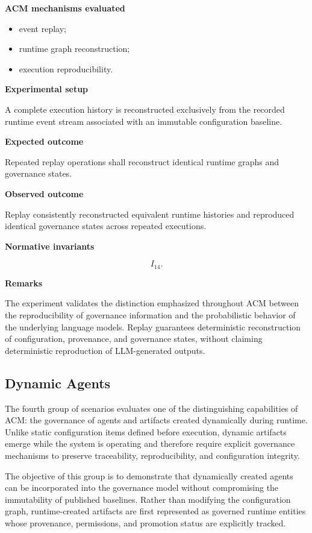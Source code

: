 \documentclass[10pt]{article}
\begin{document}
\textbf{ACM mechanisms evaluated}

\begin{itemize}
    \item event replay;
    \item runtime graph reconstruction;
    \item execution reproducibility.
\end{itemize}

\textbf{Experimental setup}

A complete execution history is reconstructed exclusively from the recorded
runtime event stream associated with an immutable configuration baseline.

\textbf{Expected outcome}

Repeated replay operations shall reconstruct identical runtime graphs and
governance states.

\textbf{Observed outcome}

Replay consistently reconstructed equivalent runtime histories and reproduced
identical governance states across repeated executions.

\textbf{Normative invariants}

\[
I_{14}.
\]

\textbf{Remarks}

The experiment validates the distinction emphasized throughout ACM between the
reproducibility of governance information and the probabilistic behavior of the
underlying language models. Replay guarantees deterministic reconstruction of
configuration, provenance, and governance states, without claiming
deterministic reproduction of LLM-generated outputs.

\subsection{Dynamic Agents}
\label{app:scenario_group_d}

The fourth group of scenarios evaluates one of the distinguishing capabilities
of ACM: the governance of agents and artifacts created dynamically during
runtime. Unlike static configuration items defined before execution, dynamic
artifacts emerge while the system is operating and therefore require explicit
governance mechanisms to preserve traceability, reproducibility, and
configuration integrity.

The objective of this group is to demonstrate that dynamically created agents
can be incorporated into the governance model without compromising the
immutability of published baselines. Rather than modifying the configuration
graph, runtime-created artifacts are first represented as governed runtime
entities whose provenance, permissions, and promotion status are explicitly
tracked.
\end{document}
